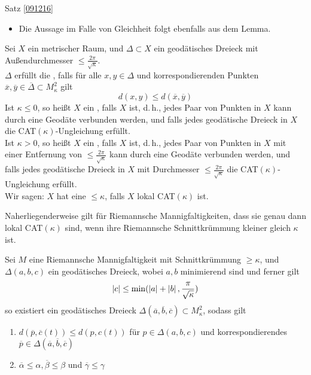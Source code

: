 \documentclass{book}
\renewcommand{\l}[1]{\overline{#1}}
\begin{document}
\begin{Beweis}{Satz \ref{091216}}
\begin{itemize}
\[ \partial_sL(0) = -\cos(\alpha) \norm{V(0)} - \cos(\chi) \norm{V(1)} = -\cos(\alpha) \]
wobei
\[ \alpha = \measuredangle_A(\dot{c}(0), V(0)) \text{ und } \chi = \measuredangle_B(-\dot{c}(1), V(1)) \]
Aufgrund der gezeigten Eigenschaft (1) nimmt die Länge $\l L(s)$ der entsprechenden variierten Geodäten im Vergleichsdreieck langsamer ab, es folgt
\[  -\cos(\alpha) = \partial_sL(0) \leq \partial_s \l L(0) = -\cos(\l \alpha) \] 
woraus folgt
\[ \l{\alpha} \leq \alpha \]
\item Die Aussage im Falle von Gleichheit folgt ebenfalls aus dem Lemma. 
\end{itemize}
\end{Beweis}

\Def{}
Sei $X$ ein metrischer Raum, und $\Delta \subset X$ ein geodätisches Dreieck mit Außendurchmesser $\leq \frac{2\pi}{\sqrt{\kappa}}$.\\
$\Delta$ erfüllt die , falls für alle $x,y\in \Delta$ und korrespondierenden Punkten $\l x,\l y \in \l \Delta \subset M^2_\kappa$ gilt
\[ d(x,y) \leq d(\l x, \l y)\]
Ist $\kappa \leq 0$, so heißt $X$ ein , falls $X$  ist, d.\,h., jedes Paar von Punkten in $X$ kann durch eine Geodäte verbunden werden, und falls jedes geodätische Dreieck in $X$ die CAT$(\kappa)$-Ungleichung erfüllt.\\
Ist $\kappa > 0$, so heißt $X$ ein , falls $X$  ist, d.\,h., jedes Paar von Punkten in $X$ mit einer Entfernung von $\leq \frac{2\pi}{\sqrt{\kappa}}$ kann durch eine Geodäte verbunden werden, und falls jedes geodätische Dreieck in $X$ mit Durchmesser $\leq \frac{2\pi}{\sqrt{\kappa}}$ die CAT$(\kappa)$-Ungleichung erfüllt.\\
Wir sagen: $X$ hat eine  $\leq \kappa$, falls $X$ lokal CAT$(\kappa)$ ist.

\Satz{}
Naherliegenderweise gilt für Riemannsche Mannigfaltigkeiten, dass sie genau dann lokal CAT$(\kappa)$ sind, wenn ihre Riemannsche Schnittkrümmung kleiner gleich $\kappa$ ist.

Sei $M$ eine Riemannsche Mannigfaltigkeit mit Schnittkrümmung $\geq \kappa$, und $\Delta(a,b,c)$ ein geodätisches Dreieck, wobei $a,b$ minimierend sind und ferner gilt
\[ \left|c\right| \leq \min(\left|a\right| + \left|b\right|, \frac{\pi}{\sqrt{\kappa}}) \]
so existiert ein geodätisches Dreieck $\Delta(\l a, \l b,\l c) \subset M^2_\kappa$, sodass gilt
\begin{enumerate}[1.)]
\item $d(\l p, \l c(t)) \leq d(p, c(t))$ für $p \in \Delta(a,b,c)$ und korrespondierendes $\l p \in \Delta(\l a,\l b, \l c)$
\item $\l \alpha \leq \alpha, \l \beta \leq \beta$ und $\l \gamma \leq \gamma$
\end{enumerate}
\end{document}
